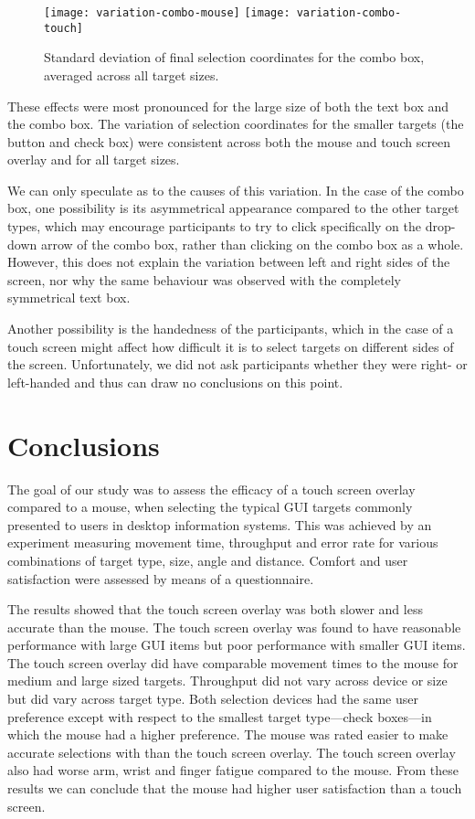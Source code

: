 \documentclass{elsart}
\begin{document}
\begin{figure}
	\centering
	\texttt{[image: variation-combo-mouse]}
	\texttt{[image: variation-combo-touch]}
	\caption{Standard deviation of final selection coordinates for the
	combo box, averaged across all target sizes.}
	\label{fig-variation-combobox}
\end{figure}


These effects were most pronounced for the large size of both the text
box and the combo box. The variation of selection coordinates for the
smaller targets (the button and check box) were consistent across both
the mouse and touch screen overlay and for all target sizes.

We can only speculate as to the causes of this variation. In the case of
the combo box, one possibility is its asymmetrical appearance compared
to the other target types, which may encourage participants to try to
click specifically on the drop-down arrow of the combo box, rather than
clicking on the combo box as a whole. However, this does not explain the
variation between left and right sides of the screen, nor why the same
behaviour was observed with the completely symmetrical text box.

Another possibility is the handedness of the participants, which in the
case of a touch screen might affect how difficult it is to select
targets on different sides of the screen. Unfortunately, we did not ask
participants whether they were right- or left-handed and thus can draw no
conclusions on this point.


\section{Conclusions}
\label{sec-conclusions}

The goal of our study was to assess the efficacy of a touch screen
overlay compared to a mouse, when selecting the typical GUI targets
commonly presented to users in desktop information systems. This was
achieved by an experiment measuring movement time, throughput and error
rate for various combinations of target type, size, angle and distance.
Comfort and user satisfaction were assessed by means of a questionnaire.

The results showed that the touch screen overlay was both slower and
less accurate than the mouse. The touch screen overlay was found to have
reasonable performance with large GUI items but poor performance with
smaller GUI items. The touch screen overlay did have comparable movement
times to the mouse for medium and large sized targets. Throughput did
not vary across device or size but did vary across target type. Both
selection devices had the same user preference except with respect to
the smallest target type---check boxes---in which the mouse had a higher
preference. The mouse was rated easier to make accurate selections with
than the touch screen overlay. The touch screen overlay also had worse
arm, wrist and finger fatigue compared to the mouse. From these results
we can conclude that the mouse had higher user satisfaction than a touch
screen.
\end{document}
